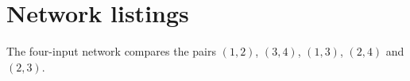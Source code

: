 \chapter{Network listings}\label{app:listings}
The four-input network compares the pairs $(1,2)$, $(3,4)$, $(1,3)$, $(2,4)$ and $(2,3)$.
